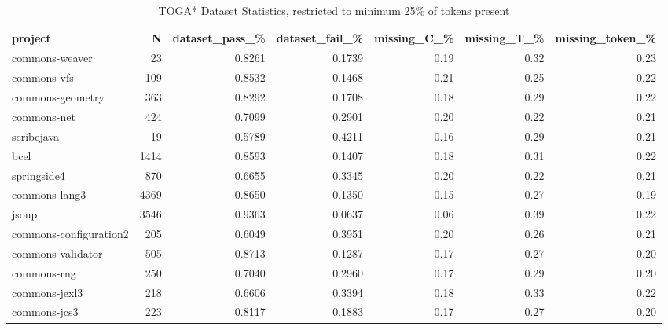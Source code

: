 \begin{table*}
\centering
\caption{TOGA* Dataset Statistics, restricted to minimum 25\% of tokens present}
\label{tab:toga_stats_25}
\begin{tabular}{lrrrrrr}
\toprule
                project &      N &  dataset\_pass\_\% &  dataset\_fail\_\% &  missing\_C\_\% &  missing\_T\_\% &  missing\_token\_\% \\
\midrule
         commons-weaver &     23 &          0.8261 &          0.1739 &         0.19 &         0.32 &             0.23 \\
            commons-vfs &    109 &          0.8532 &          0.1468 &         0.21 &         0.25 &             0.22 \\
       commons-geometry &    363 &          0.8292 &          0.1708 &         0.18 &         0.29 &             0.22 \\
            commons-net &    424 &          0.7099 &          0.2901 &         0.20 &         0.22 &             0.21 \\
             scribejava &     19 &          0.5789 &          0.4211 &         0.16 &         0.29 &             0.21 \\
                   bcel &   1414 &          0.8593 &          0.1407 &         0.18 &         0.31 &             0.22 \\
            springside4 &    870 &          0.6655 &          0.3345 &         0.20 &         0.22 &             0.21 \\
          commons-lang3 &   4369 &          0.8650 &          0.1350 &         0.15 &         0.27 &             0.19 \\
                  jsoup &   3546 &          0.9363 &          0.0637 &         0.06 &         0.39 &             0.22 \\
 commons-configuration2 &    205 &          0.6049 &          0.3951 &         0.20 &         0.26 &             0.21 \\
      commons-validator &    505 &          0.8713 &          0.1287 &         0.17 &         0.27 &             0.20 \\
            commons-rng &    250 &          0.7040 &          0.2960 &         0.17 &         0.29 &             0.20 \\
          commons-jexl3 &    218 &          0.6606 &          0.3394 &         0.18 &         0.33 &             0.22 \\
           commons-jcs3 &    223 &          0.8117 &          0.1883 &         0.17 &         0.27 &             0.20 \\

\end{tabular}
\end{table*}
